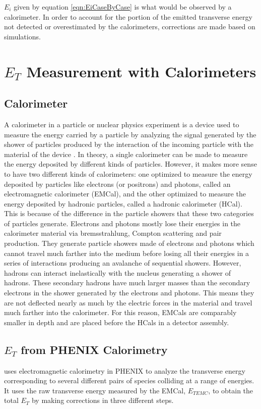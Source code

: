 $E_{i}$ given by equation \ref{eqn:EiCaseByCase} is what would be observed by a calorimeter. In order to account for the portion of the emitted transverse energy not detected or overestimated by the calorimeters, corrections are made based on simulations.

\section{$E_{T}$ Measurement with Calorimeters}
\subsection{Calorimeter}\label{section:calorimeters}
A calorimeter in a particle or nuclear physics experiment is a device used to measure the energy carried by a particle by analyzing the signal generated by the shower of particles produced by the interaction of the incoming particle with the material of the device \cite{1674-1137-40-10-100001}. In theory, a single calorimeter can be made to measure the energy deposited by different kinds of particles. However, it makes more sense to have two different kinds of calorimeters: one optimized to measure the energy deposited by particles like electrons (or positrons) and photons, called an electromagnetic calorimeter (EMCal), and the other optimized to measure the energy deposited by hadronic particles, called a hadronic calorimeter (HCal). This is because of the difference in the particle showers that these two categories of particles generate. Electrons and photons mostly lose their energies in the calorimeter material via bremsstrahlung, Compton scattering and pair production. They generate particle showers made of electrons and photons which cannot travel much farther into the medium before losing all their energies in a series of interactions producing an avalanche of sequential showers. However, hadrons can interact inelastically with the nucleus generating a shower of hadrons. These secondary hadrons have much larger masses than the secondary electrons in the shower generated by the electrons and photons. This means they are not deflected nearly as much by the electric forces in the material and travel much farther into the calorimeter. For this reason, EMCals are comparably smaller in depth and are placed before the HCals in a detector assembly.
  
\subsection{$E_{T}$ from PHENIX Calorimetry}
\citet{PhysRevC.93.024901} uses electromagnetic calorimetry in PHENIX to analyze the transverse energy corresponding to several different pairs of species colliding at a range of energies. It uses the raw transverse energy measured by the EMCal, $E_{{T}EMC}$, to obtain the total $E_{T}$ by making corrections in three different steps.

